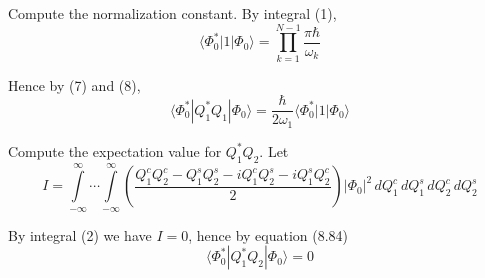 \bigskip
Compute the normalization constant.
By integral (1),
\begin{equation*}
\langle\Phi_0^*|1|\Phi_0\rangle
=\prod_{k=1}^{N-1}\frac{\pi\hbar}{\omega_k}
\tag{8}
\end{equation*}

Hence by (7) and (8),
\begin{equation*}
\langle\Phi_0^*|Q_1^*Q_1|\Phi_0\rangle=\frac{\hbar}{2\omega_1}\langle\Phi_0^*|1|\Phi_0\rangle
\end{equation*}

Compute the expectation value for $Q_1^*Q_2$.
Let
\begin{equation*}
I=\int\limits_{-\infty}^\infty\cdots\int\limits_{-\infty}^\infty
\left(\frac{Q_1^cQ_2^c-Q_1^sQ_2^s-iQ_1^cQ_2^s-iQ_1^sQ_2^c}{2}\right)
\vert\Phi_0\vert^2\,dQ_1^c\,dQ_1^s\,dQ_2^c\,dQ_2^s
\end{equation*}

By integral (2) we have $I=0$, hence by equation (8.84)
\begin{equation*}
\langle\Phi_0^*|Q_1^*Q_2|\Phi_0\rangle=0
\end{equation*}


